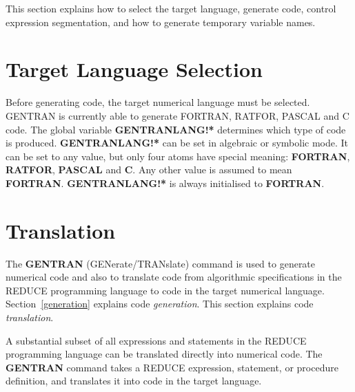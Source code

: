 This section explains how to select the target language, generate
code, control expression segmentation, and how to generate temporary
variable names.

\section{Target Language Selection}
\label{gentranlang}
Before generating code, the target numerical language must be
selected.  GENTRAN is currently able to generate FORTRAN, RATFOR, PASCAL and C
code.  The global variable {\bf GENTRANLANG!*} determines which type of
code is produced.  {\bf GENTRANLANG!*} can be set in algebraic or
symbolic mode.  It can be set to any value, but only four atoms
have special meaning:  {\bf FORTRAN}, {\bf RATFOR}, {\bf PASCAL}
and {\bf C}.  Any
other value is assumed to mean {\bf FORTRAN}.  {\bf GENTRANLANG!*}
is always initialised to {\bf FORTRAN}.


\section{Translation}
\label{translation}
The {\bf GENTRAN} (GENerate/TRANslate) command is used to generate
numerical code and also to translate code from algorithmic specifications
in the REDUCE programming language to code in the target numerical
language.  Section~\ref{generation}
explains code {\it generation}.  This section explains code {\it translation}.

A substantial subset of all expressions and statements in the REDUCE
programming language can be translated directly into numerical code.  The
{\bf GENTRAN} command takes a REDUCE expression, statement,
or procedure definition, and translates it into code in the
target language.

